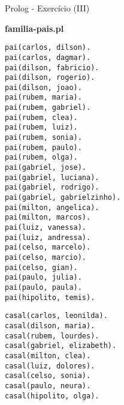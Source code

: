 \begin{frame}[fragile]{Prolog - Exercício (III)}
	\begin{center}
	{\bf familia-pais.pl}
	\end{center}

\begin{minipage}{0.4\textwidth}
\begin{tiny}
\begin{lstlisting}
pai(carlos, dilson).
pai(carlos, dagmar).
pai(dilson, fabricio).
pai(dilson, rogerio).
pai(dilson, joao).
pai(rubem, maria).
pai(rubem, gabriel).
pai(rubem, clea).
pai(rubem, luiz).
pai(rubem, sonia).
pai(rubem, paulo).
pai(rubem, olga).
pai(gabriel, jose).
pai(gabriel, luciana).
pai(gabriel, rodrigo).
pai(gabriel, gabrielzinho).
pai(milton, angelica).
pai(milton, marcos).
pai(luiz, vanessa).
pai(luiz, andressa).
pai(celso, marcelo).
pai(celso, marcio).
pai(celso, gian).
pai(paulo, julia).
pai(paulo, paula).
pai(hipolito, temis).
\end{lstlisting}
\end{tiny}
\end{minipage}
\begin{minipage}{0.4\textwidth}
\begin{tiny}
\begin{lstlisting}
casal(carlos, leonilda).
casal(dilson, maria).
casal(rubem, lourdes).
casal(gabriel, elizabeth).
casal(milton, clea).
casal(luiz, dolores).
casal(celso, sonia).
casal(paulo, neura).
casal(hipolito, olga).
\end{lstlisting}
\end{tiny}
\end{minipage}
\end{frame}

